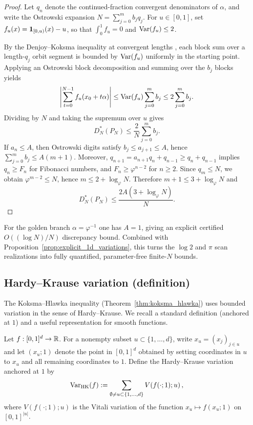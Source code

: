 \begin{proof}
Let $q_n$ denote the continued-fraction convergent denominators of $\alpha$, and write the Ostrowski expansion $N=\sum_{j=0}^m b_j q_j$. For $u\in[0,1]$, set $f_u(x)=\mathbf{1}_{[0,u)}(x)-u$, so that $\int_0^1 f_u=0$ and $\mathrm{Var}(f_u)\le 2$.

By the Denjoy--Koksma inequality at convergent lengths \cite{Denjoy1932,Koksma1935,KatokHasselblatt1995}, each block sum over a length-$q_j$ orbit segment is bounded by $\mathrm{Var}(f_u)$ uniformly in the starting point. Applying an Ostrowski block decomposition and summing over the $b_j$ blocks yields
\[
\left|\sum_{t=0}^{N-1} f_u(x_0+t\alpha)\right|\le \mathrm{Var}(f_u)\sum_{j=0}^m b_j \le 2\sum_{j=0}^m b_j.
\]
Dividing by $N$ and taking the supremum over $u$ gives
\[
D_N^\ast(P_N)\le \frac{2}{N}\sum_{j=0}^m b_j.
\]
If $a_n\le A$, then Ostrowski digits satisfy $b_j\le a_{j+1}\le A$, hence $\sum_{j=0}^m b_j\le A(m+1)$.
Moreover, $q_{n+1}=a_{n+1}q_n+q_{n-1}\ge q_n+q_{n-1}$ implies $q_n\ge F_n$ for Fibonacci numbers, and $F_n\ge \varphi^{n-2}$ for $n\ge 2$. Since $q_m\le N$, we obtain $\varphi^{m-2}\le N$, hence $m\le 2+\log_\varphi N$. Therefore $m+1\le 3+\log_\varphi N$ and
\[
D_N^\ast(P_N)\le \frac{2A(3+\log_\varphi N)}{N}.
\]
\end{proof}

\begin{remark}
For the golden branch $\alpha=\varphi^{-1}$ one has $A=1$, giving an explicit certified $O((\log N)/N)$ discrepancy bound. Combined with Proposition~\ref{prop:explicit_1d_variations}, this turns the $\log 2$ and $\pi$ scan realizations into fully quantified, parameter-free finite-$N$ bounds.
\end{remark}

\subsection{Hardy--Krause variation (definition)}
\label{app:hk_variation_definition}

The Koksma--Hlawka inequality (Theorem~\ref{thm:koksma_hlawka}) uses bounded variation in the sense of Hardy--Krause. We recall a standard definition (anchored at $1$) and a useful representation for smooth functions.

\begin{definition}
\label{def:hk_variation}
Let $f:[0,1]^d\to\mathbb{R}$. For a nonempty subset $u\subset\{1,\dots,d\}$, write $x_u=(x_j)_{j\in u}$ and let $(x_u;1)$ denote the point in $[0,1]^d$ obtained by setting coordinates in $u$ to $x_u$ and all remaining coordinates to $1$.
Define the Hardy--Krause variation anchored at $1$ by
\begin{equation}
\label{eq:hk_variation_def}
\mathrm{Var}_{\mathrm{HK}}(f):=\sum_{\emptyset\neq u\subset\{1,\dots,d\}} V\!\left(f(\cdot;1);u\right),
\end{equation}
where $V(f(\cdot;1);u)$ is the Vitali variation of the function $x_u\mapsto f(x_u;1)$ on $[0,1]^{|u|}$.
\end{definition}

